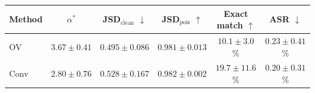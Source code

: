 \begin{tabular}{lccccc}
\toprule
Method & $\alpha^*$ & JSD$_\text{clean}$ $\downarrow$ & JSD$_\text{pois}$ $\uparrow$ & Exact match $\uparrow$ & ASR $\downarrow$ \\
\midrule
OV & $3.67 \pm 0.41$ & $0.495 \pm 0.086$ & $0.981 \pm 0.013$ & $10.1 \pm 3.0$\% & $0.23 \pm 0.41$\% \\
Conv & $2.80 \pm 0.76$ & $0.528 \pm 0.167$ & $0.982 \pm 0.002$ & $19.7 \pm 11.6$\% & $0.20 \pm 0.31$\% \\
\bottomrule
\end{tabular}
